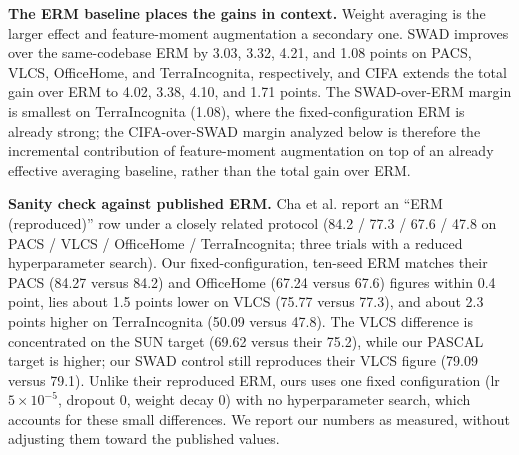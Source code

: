 \documentclass[electronics,article,submit,moreauthors]{Definitions/mdpi}
\begin{document}
\textbf{The ERM baseline places the gains in context.} Weight averaging is the larger effect and feature-moment augmentation a secondary one. SWAD improves over the same-codebase ERM by 3.03, 3.32, 4.21, and 1.08 points on PACS, VLCS, OfficeHome, and TerraIncognita, respectively, and CIFA extends the total gain over ERM to 4.02, 3.38, 4.10, and 1.71 points. The SWAD-over-ERM margin is smallest on TerraIncognita (1.08), where the fixed-configuration ERM is already strong; the CIFA-over-SWAD margin analyzed below is therefore the incremental contribution of feature-moment augmentation on top of an already effective averaging baseline, rather than the total gain over ERM.

\textbf{Sanity check against published ERM.} Cha et al. report an ``ERM (reproduced)'' row under a closely related protocol (84.2 / 77.3 / 67.6 / 47.8 on PACS / VLCS / OfficeHome / TerraIncognita; three trials with a reduced hyperparameter search). Our fixed-configuration, ten-seed ERM matches their PACS (84.27 versus 84.2) and OfficeHome (67.24 versus 67.6) figures within 0.4 point, lies about 1.5 points lower on VLCS (75.77 versus 77.3), and about 2.3 points higher on TerraIncognita (50.09 versus 47.8). The VLCS difference is concentrated on the SUN target (69.62 versus their 75.2), while our PASCAL target is higher; our SWAD control still reproduces their VLCS figure (79.09 versus 79.1). Unlike their reproduced ERM, ours uses one fixed configuration (lr $5\times10^{-5}$, dropout 0, weight decay 0) with no hyperparameter search, which accounts for these small differences. We report our numbers as measured, without adjusting them toward the published values.
\end{document}
